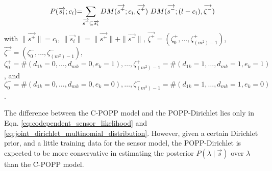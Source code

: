 \begin{equation}
	\label{eq:joint_dirichlet_multinomial_distribution}
    \begin{tabular}{r@{=}l}
		$P(\overrightarrow{s_i} ; c_i)$ & $\displaystyle\sum_{\overrightarrow{s^+} \subseteq \overrightarrow{s_i}} DM(\overrightarrow{s^+} ; c_i, \overrightarrow{\zeta^+}) ~ DM(\overrightarrow{s^-} ; (l - c_i), \overrightarrow{\zeta^-})$
	\end{tabular}
\end{equation}
\noindent with $\parallel \overrightarrow{s^+} \parallel = c_i$, $\parallel \overrightarrow{s_i} \parallel = \parallel \overrightarrow{s^+} \parallel + \parallel \overrightarrow{s^-} \parallel$, $\overrightarrow{\zeta^+} = (\zeta^+_0, \ldots, \zeta^+_{(m^2)-1})$, $\overrightarrow{\zeta^-} = (\zeta^-_0, \ldots, \zeta^-_{(m^2)-1})$, $\zeta^+_0 = \#(d_{1k} = 0, \ldots, d_{mk} = 0, e_k = 1), \ldots, \zeta^+_{(m^2)-1} = \#(d_{1k} = 1, \ldots, d_{mk} = 1, e_k = 1)$, and $\zeta^-_0 = \#(d_{1k} = 0, \ldots, d_{mk} = 0, e_k = 0), \ldots, \zeta^-_{(m^2)-1} = \#(d_{1k} = 1, \ldots, d_{mk} = 1, e_k = 0)$.


The difference between the C-POPP model and the POPP-Dirichlet lies only in Eqn. \ref{eq:codependent_sensor_likelihood} and \ref{eq:joint_dirichlet_multinomial_distribution}. However, given a certain Dirichlet prior, and a little training data for the sensor model, the POPP-Dirichlet is expected to be more conservative in estimating the posterior $P(\lambda \mid \overrightarrow{s})$ over $\lambda$ than the C-POPP model.

